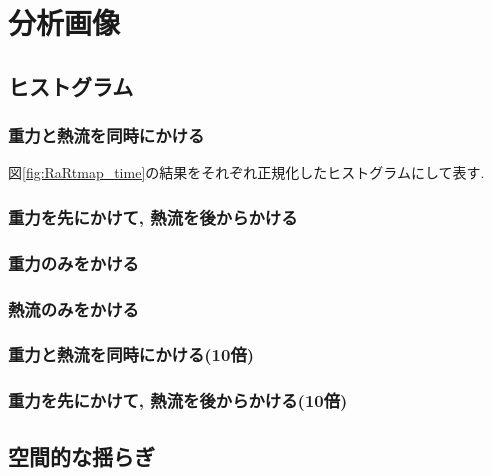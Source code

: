\chapter{分析画像}\label{ap:analysis}

\section{ヒストグラム}

\subsection{重力と熱流を同時にかける}

図\ref{fig:RaRtmap_time}の結果をそれぞれ正規化したヒストグラムにして表す.



\subsection{重力を先にかけて, 熱流を後からかける}



\subsection{重力のみをかける}



\subsection{熱流のみをかける}



\subsection{重力と熱流を同時にかける(10倍)}



\subsection{重力を先にかけて, 熱流を後からかける(10倍)}



\section{空間的な揺らぎ}


